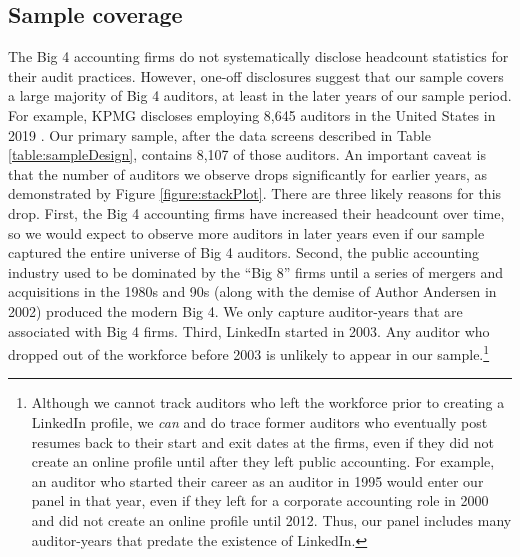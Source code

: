 \documentclass[11pt]{article}
\begin{document}
    \subsection{Sample coverage}\label{section:sampleCoverage}
        The Big 4 accounting firms do not systematically disclose headcount statistics for their audit practices. However, one-off disclosures suggest that our sample covers a large majority of Big 4 auditors, at least in the later years of our sample period. For example, KPMG discloses employing 8,645 auditors in the United States in 2019 \parencite{kpmg2022ApproachAudit2022}. Our primary sample, after the data screens described in Table \ref{table:sampleDesign}, contains 8,107 of those auditors. An important caveat is that the number of auditors we observe drops significantly for earlier years, as demonstrated by Figure \ref{figure:stackPlot}. There are three likely reasons for this drop. First, the Big 4 accounting firms have increased their headcount over time, so we would expect to observe more auditors in later years even if our sample captured the entire universe of Big 4 auditors. Second, the public accounting industry used to be dominated by the ``Big 8'' firms until a series of mergers and acquisitions in the 1980s and 90s (along with the demise of Author Andersen in 2002) produced the modern Big 4. We only capture auditor-years that are associated with Big 4 firms. Third, LinkedIn started in 2003. Any auditor who dropped out of the workforce before 2003 is unlikely to appear in our sample.\footnote{Although we cannot track auditors who left the workforce prior to creating a LinkedIn profile, we \textit{can} and do trace former auditors who eventually post resumes back to their start and exit dates at the firms, even if they did not create an online profile until after they left public accounting. For example, an auditor who started their career as an auditor in 1995 would enter our panel in that year, even if they left for a corporate accounting role in 2000 and did not create an online profile until 2012. Thus, our panel includes many auditor-years that predate the existence of LinkedIn.} 
        
\end{document}
